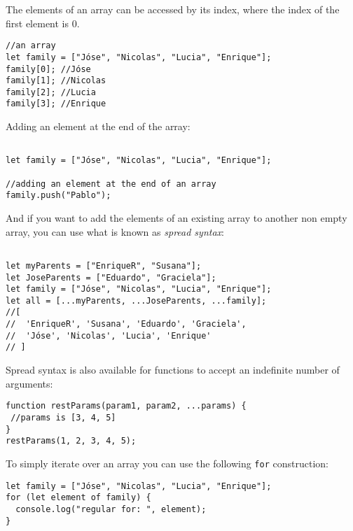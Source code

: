 \documentclass[a4paper, oneside, titlepage, 12pt]{book}
\begin{document}
The elements of an array can be accessed by its index, where the index of the first element is 0.

\begin{verbatim}
//an array
let family = ["Jóse", "Nicolas", "Lucia", "Enrique"];
family[0]; //Jóse
family[1]; //Nicolas
family[2]; //Lucia
family[3]; //Enrique
\end{verbatim}

Adding an element at the end of the array:

\begin{verbatim}

let family = ["Jóse", "Nicolas", "Lucia", "Enrique"];

//adding an element at the end of an array
family.push("Pablo");
\end{verbatim}

And if you want to add the elements of an existing array to another non empty array, you can use what is known as \textit{spread syntax}:

\begin{verbatim}

let myParents = ["EnriqueR", "Susana"];
let JoseParents = ["Eduardo", "Graciela"];
let family = ["Jóse", "Nicolas", "Lucia", "Enrique"];
let all = [...myParents, ...JoseParents, ...family];
//[
//  'EnriqueR', 'Susana', 'Eduardo', 'Graciela', 
//  'Jóse', 'Nicolas', 'Lucia', 'Enrique'
// ]
\end{verbatim}

Spread syntax is also available for functions to accept an indefinite number of arguments:

\begin{verbatim}
function restParams(param1, param2, ...params) {
 //params is [3, 4, 5]	
}
restParams(1, 2, 3, 4, 5);
\end{verbatim}

To simply iterate over an array you can use the following \texttt{for} construction: 

\begin{verbatim}
let family = ["Jóse", "Nicolas", "Lucia", "Enrique"];
for (let element of family) {
  console.log("regular for: ", element);
}
\end{verbatim}
               
\end{document}
